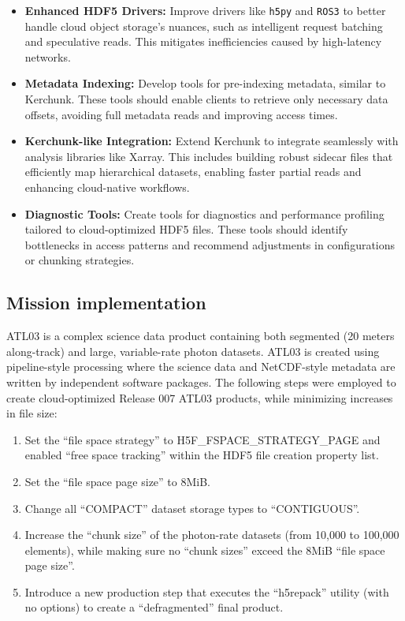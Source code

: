 \documentclass[
]{agujournal2019}
\providecommand{\tightlist}{%
  \setlength{\itemsep}{0pt}\setlength{\parskip}{0pt}}
\begin{document}
\begin{itemize}
\tightlist
\item
  \textbf{Enhanced HDF5 Drivers:} Improve drivers like \texttt{h5py} and
  \texttt{ROS3} to better handle cloud object storage's nuances, such as
  intelligent request batching and speculative reads. This mitigates
  inefficiencies caused by high-latency networks.
\item
  \textbf{Metadata Indexing:} Develop tools for pre-indexing metadata,
  similar to Kerchunk. These tools should enable clients to retrieve
  only necessary data offsets, avoiding full metadata reads and
  improving access times.
\item
  \textbf{Kerchunk-like Integration:} Extend Kerchunk to integrate
  seamlessly with analysis libraries like Xarray. This includes building
  robust sidecar files that efficiently map hierarchical datasets,
  enabling faster partial reads and enhancing cloud-native workflows.
\item
  \textbf{Diagnostic Tools:} Create tools for diagnostics and
  performance profiling tailored to cloud-optimized HDF5 files. These
  tools should identify bottlenecks in access patterns and recommend
  adjustments in configurations or chunking strategies.
\end{itemize}

\subsection{Mission implementation}\label{mission-implementation}

ATL03 is a complex science data product containing both segmented (20
meters along-track) and large, variable-rate photon datasets. ATL03 is
created using pipeline-style processing where the science data and
NetCDF-style metadata are written by independent software packages. The
following steps were employed to create cloud-optimized Release 007
ATL03 products, while minimizing increases in file size:

\begin{enumerate}
\def\labelenumi{\arabic{enumi}.}
\tightlist
\item
  Set the ``file space strategy'' to H5F\_FSPACE\_STRATEGY\_PAGE and
  enabled ``free space tracking'' within the HDF5 file creation property
  list.
\item
  Set the ``file space page size'' to 8MiB.
\item
  Change all ``COMPACT'' dataset storage types to ``CONTIGUOUS''.
\item
  Increase the ``chunk size'' of the photon-rate datasets (from 10,000
  to 100,000 elements), while making sure no ``chunk sizes'' exceed the
  8MiB ``file space page size''.
\item
  Introduce a new production step that executes the ``h5repack'' utility
  (with no options) to create a ``defragmented'' final product.
\end{enumerate}
\end{document}
